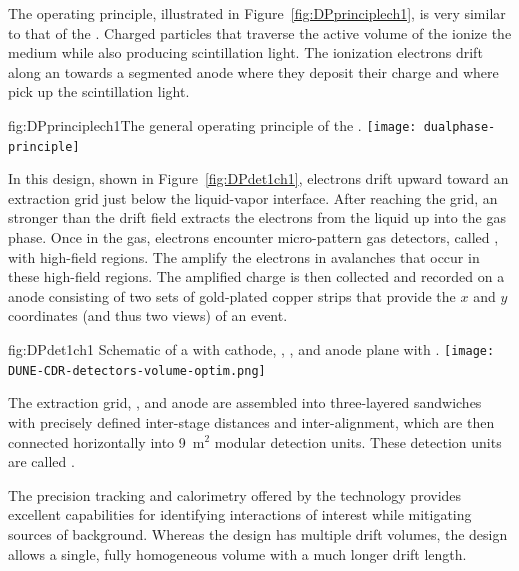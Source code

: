The  operating principle, illustrated in Figure~\ref{fig:DPprinciplech1}, is very similar to that of the . %
 Charged particles that traverse the active volume of the  ionize the medium while also producing scintillation light.  The ionization electrons drift along an \efield towards a segmented anode where they deposit their charge and where   pick up the scintillation light. 
 
 
\begin{dunefigure}{fig:DPprinciplech1}{The general operating principle of the  .}
\texttt{[image: dualphase-principle]}
\end{dunefigure}

In this design, shown in Figure~\ref{fig:DPdet1ch1}, electrons drift upward toward an extraction grid just below the liquid-vapor interface. 
After reaching the grid, an \efield stronger than the \dpnominaldriftfield{} drift field extracts the electrons from the liquid up into the gas phase. Once in the gas, electrons encounter micro-pattern gas detectors, called , with high-field regions. The  amplify the electrons in avalanches that occur in these high-field regions. The amplified charge is then collected and recorded on a \twod anode
consisting of two sets of %
gold-plated copper strips that provide the $x$ and $y$ coordinates (and thus two views) of an event. 

\begin{dunefigure}{fig:DPdet1ch1}
  {Schematic of a \nominalmodsize {}    with cathode, , , and anode plane with .}
  \texttt{[image: DUNE-CDR-detectors-volume-optim.png]}
\end{dunefigure}

 The extraction grid, , and anode are assembled into three-layered sandwiches with precisely defined inter-stage distances and inter-alignment,  which are then connected horizontally into \num{9}~m$^2$ modular detection units. These detection units are called .

The precision tracking and calorimetry offered by the  technology provides excellent capabilities for identifying interactions of interest while mitigating sources of background.  Whereas the  design has multiple drift volumes, the  design allows a single, fully homogeneous  volume with a much longer drift length.

